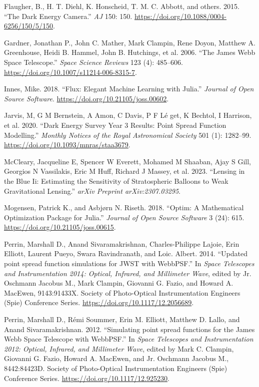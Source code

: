 \documentclass[10pt,a4paper,onecolumn]{article}
\begin{document}
\begin{cslreferences}
\leavevmode\hypertarget{ref-2015AJ}{}%
Flaugher, B., H. T. Diehl, K. Honscheid, T. M. C. Abbott, and others.
2015. ``The Dark Energy Camera.'' \emph{AJ} 150: 150.
\url{https://doi.org/10.1088/0004-6256/150/5/150}.

\leavevmode\hypertarget{ref-Gardner_2006}{}%
Gardner, Jonathan P., John C. Mather, Mark Clampin, Rene Doyon, Matthew
A. Greenhouse, Heidi B. Hammel, John B. Hutchings, et al. 2006. ``The
James Webb Space Telescope.'' \emph{Space Science Reviews} 123 (4):
485--606. \url{https://doi.org/10.1007/s11214-006-8315-7}.

\leavevmode\hypertarget{ref-innes:2018}{}%
Innes, Mike. 2018. ``Flux: Elegant Machine Learning with Julia.''
\emph{Journal of Open Source Software}.
\url{https://doi.org/10.21105/joss.00602}.

\leavevmode\hypertarget{ref-Jarvis_2020}{}%
Jarvis, M, G M Bernstein, A Amon, C Davis, P F Lé get, K Bechtol, I
Harrison, et al. 2020. ``Dark Energy Survey Year 3 Results: Point Spread
Function Modelling.'' \emph{Monthly Notices of the Royal Astronomical
Society} 501 (1): 1282--99.
\url{https://doi.org/10.1093/mnras/staa3679}.

\leavevmode\hypertarget{ref-mccleary2023lensing}{}%
McCleary, Jacqueline E, Spencer W Everett, Mohamed M Shaaban, Ajay S
Gill, Georgios N Vassilakis, Eric M Huff, Richard J Massey, et al. 2023.
``Lensing in the Blue Ii: Estimating the Sensitivity of Stratospheric
Balloons to Weak Gravitational Lensing.'' \emph{arXiv Preprint
arXiv:2307.03295}.

\leavevmode\hypertarget{ref-Mogensen2018}{}%
Mogensen, Patrick K., and Asbjørn N. Riseth. 2018. ``Optim: A
Mathematical Optimization Package for Julia.'' \emph{Journal of Open
Source Software} 3 (24): 615. \url{https://doi.org/10.21105/joss.00615}.

\leavevmode\hypertarget{ref-2014SPIE}{}%
Perrin, Marshall D., Anand Sivaramakrishnan, Charles-Philippe Lajoie,
Erin Elliott, Laurent Pueyo, Swara Ravindranath, and Loic. Albert. 2014.
``Updated point spread function simulations for JWST with WebbPSF.'' In
\emph{Space Telescopes and Instrumentation 2014: Optical, Infrared, and
Millimeter Wave}, edited by Jr. Oschmann Jacobus M., Mark Clampin,
Giovanni G. Fazio, and Howard A. MacEwen, 9143:91433X. Society of
Photo-Optical Instrumentation Engineers (Spie) Conference Series.
\url{https://doi.org/10.1117/12.2056689}.

\leavevmode\hypertarget{ref-2012SPIE}{}%
Perrin, Marshall D., Rémi Soummer, Erin M. Elliott, Matthew D. Lallo,
and Anand Sivaramakrishnan. 2012. ``Simulating point spread functions
for the James Webb Space Telescope with WebbPSF.'' In \emph{Space
Telescopes and Instrumentation 2012: Optical, Infrared, and Millimeter
Wave}, edited by Mark C. Clampin, Giovanni G. Fazio, Howard A. MacEwen,
and Jr. Oschmann Jacobus M., 8442:84423D. Society of Photo-Optical
Instrumentation Engineers (Spie) Conference Series.
\url{https://doi.org/10.1117/12.925230}.


\end{cslreferences}
\end{document}
